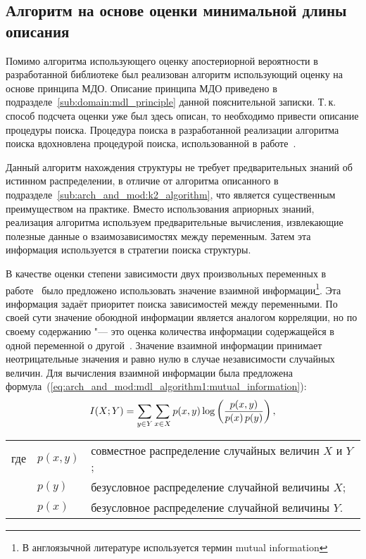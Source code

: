 \subsection{Алгоритм на основе оценки минимальной длины описания}
\label{sub:arch_and_mod:mdl_algorithm1}
Помимо алгоритма использующего оценку апостериорной вероятности в разработанной библиотеке был реализован алгоритм использующий оценку на основе принципа МДО.
Описание принципа МДО приведено в подразделе~\ref{sub:domain:mdl_principle} данной пояснительной записки.
Т.\,к. способ подсчета оценки уже был здесь описан, то необходимо привести описание процедуры поиска.
Процедура поиска в разработанной реализации алгоритма поиска вдохновлена процедурой поиска, использованной в работе~\cite{terentyev_2006}.

Данный алгоритм нахождения структуры не требует предварительных знаний об истинном распределении, в отличие от алгоритма описанного в подразделе~\ref{sub:arch_and_mod:k2_algorithm}, что является существенным преимуществом на практике.
Вместо использования априорных знаний, реализация алгоритма используем предварительные вычисления, извлекающие полезные данные о взаимозависимостях между переменным.
Затем эта информация используется в стратегии поиска структуры.

В качестве оценки степени зависимости двух произвольных переменных в работе~\cite{Chow68approximatingdiscrete} было предложено использовать значение взаимной информации\footnote{В англоязычной литературе используется термин mutual information}.
Эта информация задаёт приоритет поиска зависимостей между переменными.
По своей сути значение обоюдной информации является аналогом корреляции, но по своему содержанию "--- это оценка количества информации содержащейся в одной переменной о другой~\cite{terentyev_2006}.
Значение взаимной информации принимает неотрицательные значения и равно нулю в случае независимости случайных величин.
Для вычисления взаимной информации была предложена формула~(\ref{eq:arch_and_mod:mdl_algorithm1:mutual_information}):
\begin{equation}
  \label{eq:arch_and_mod:mdl_algorithm1:mutual_information}
  I(X; Y) = \sum_{y \in Y} \sum_{x \in X} 
                 p(x, y) \log{ \left(\frac{p(x, y)}{p(x)\,p(y)}
                              \right) } \text{\,,}
\end{equation}
\par
\begin{tabular}{@{}ll@{ --- }p{}}
где & $ p(x, y)$ & совместное распределение случайных величин $X$ и $Y$; \\
    & $ p(y) $ & безусловное распределение случайной величины $X$; \\
    & $ p(x) $ & безусловное распределение случайной величины $Y$. \\[\parsep]
\end{tabular}

